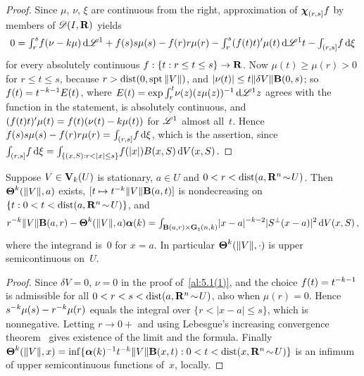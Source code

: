 \begin{proof}
    Since $\mu$, $\nu$, $\xi$ are continuous from the right, approximation of $\boldsymbol{\chi}_{(r,s]} f$ by
    members of $\mathscr{D}(I,\mathbf{R})$ yields
    \begin{displaymath}
        0 = {\textstyle\int_{r}^{s}} f (\nu - k \mu) \,\mathrm{d} \mathscr{L}^1 + f(s) s \mu(s) - f(r) r \mu(r) -
        {\textstyle\int_{r}^{s}} (f(t) t)' \mu(t) \,\mathrm{d} \mathscr{L}^1 t - {\textstyle\int_{(r,s]}^{}} f \,\mathrm{d} \xi
    \end{displaymath}
    for every absolutely continuous $f : \{ t : r \le t \le s \} \to \mathbf{R}$. Now $\mu(t) \ge \mu(r) >
    0$ for $r \le t \le s$, because $r > \operatorname{dist}(0,\operatorname{spt} \|V\|)$, and $|\nu(t)| \le t \|\delta
    V\| \mathbf{B}(0,s)$; so $f(t) = t^{-k-1} E(t)$, where $E(t) = \exp {\textstyle\int_{r}^{t}} \nu(z)
    (z \mu(z))^{-1} \,\mathrm{d} \mathscr{L}^1 z$ agrees with the function in the statement, is absolutely
    continuous, and $(f(t) t)' \mu(t) = f(t) (\nu(t) - k \mu(t))$ for $\mathscr{L}^1$ almost all~$t$.
    Hence $f(s) s \mu(s) - f(r) r \mu(r) = {\textstyle\int_{(r,s]}^{}} f \,\mathrm{d} \xi$, which is the assertion,
    since ${\textstyle\int_{(r,s]}^{}} f \,\mathrm{d} \xi = {\textstyle\int_{\{ (x,S) : r < |x| \le s \}}^{}} f(|x|) B(x,S) \,\mathrm{d}
    V(x,S)$.
\end{proof}

\begin{corollary}
    \label{al:5.1(2)}
    Suppose $V \in \mathbf{V}_{k}(U)$ is stationary, $a \in U$ and $0 < r < \operatorname{dist}(a, \mathbf{R}^{n}
    \!\sim\! U)$. Then $\boldsymbol{\Theta}^{k}(\|V\|,a)$ exists, $[t \mapsto t^{-k} \|V\|
    \mathbf{B}(a,t)]$ is nondecreasing on $\{ t : 0 < t < \operatorname{dist}(a, \mathbf{R}^{n} \!\sim\! U) \}$, and
    \begin{displaymath}
        r^{-k} \|V\| \mathbf{B}(a,r) - \boldsymbol{\Theta}^{k}(\|V\|,a) \boldsymbol{\alpha}(k) =
        {\textstyle\int_{\mathbf{B}(a,r) \times \mathbf{G}_{\natural}(n,k)}^{}} |x-a|^{-k-2} |S^\perp(x-a)|^2 \,\mathrm{d}
        V(x,S) \,,
    \end{displaymath}
    where the integrand is~$0$ for $x = a$. In particular $\boldsymbol{\Theta}^{k}(\|V\|,\cdot)$ is upper
    semicontinuous on~$U$.
\end{corollary}

\begin{proof}
    Since $\delta V = 0$, $\nu = 0$ in the proof of~\ref{al:5.1(1)}, and the choice $f(t) =
    t^{-k-1}$ is admissible for all $0 < r < s < \operatorname{dist}(a, \mathbf{R}^{n} \!\sim\! U)$, also when
    $\mu(r) = 0$. Hence $s^{-k} \mu(s) - r^{-k} \mu(r)$ equals the integral over $\{ r <
    |x-a| \le s \}$, which is nonnegative. Letting $r \to 0+$ and using Lebesgue's increasing
    convergence theorem~\cite[2.4.7]{Federer1969} gives existence of the limit and the formula.
    Finally $\boldsymbol{\Theta}^{k}(\|V\|,x) = \inf \{ \boldsymbol{\alpha}(k)^{-1} t^{-k} \|V\|
    \mathbf{B}(x,t) : 0 < t < \operatorname{dist}(x, \mathbf{R}^{n} \!\sim\! U) \}$ is an infimum of upper
    semicontinuous functions of~$x$, locally.
\end{proof}


